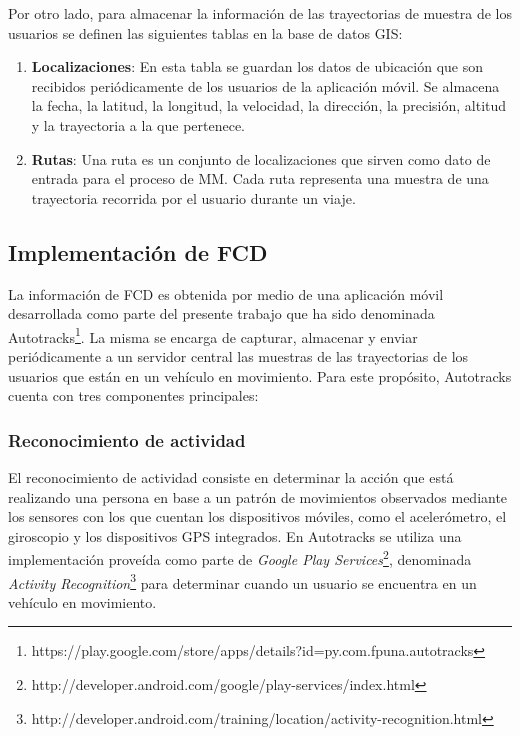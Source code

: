 Por otro lado, para almacenar la información de las trayectorias de muestra de los usuarios se definen las siguientes tablas en la base de datos GIS:
\begin{enumerate}
\item \textbf{Localizaciones}: En esta tabla se guardan los datos de ubicación que son recibidos periódicamente de los usuarios de la aplicación móvil. Se almacena la fecha, la latitud, la longitud, la velocidad, la dirección, la precisión, altitud y la trayectoria a la que pertenece.
\item \textbf{Rutas}: Una ruta es un conjunto de localizaciones que sirven como dato de entrada para el proceso de MM. Cada ruta representa una muestra de una trayectoria recorrida por el usuario durante un viaje.
\end{enumerate}

\subsection{Implementación de FCD}
\label{floating-car-data}

La información de FCD es obtenida por medio de una aplicación móvil desarrollada como parte del presente trabajo que ha sido denominada Autotracks\footnote{https://play.google.com/store/apps/details?id=py.com.fpuna.autotracks}. La misma se encarga de capturar, almacenar y enviar periódicamente a un servidor central las muestras de las trayectorias de los usuarios que están en un vehículo en movimiento. Para este propósito, Autotracks cuenta con tres componentes principales: 

\subsubsection{Reconocimiento de actividad}
\label{reconocimiento_actividad}

El reconocimiento de actividad consiste en determinar la acción que está realizando una persona en base a un patrón de movimientos observados mediante los sensores con los que cuentan los dispositivos móviles, como el acelerómetro, el giroscopio y los dispositivos GPS integrados. En Autotracks se utiliza una implementación proveída como parte de \emph{Google Play Services}\footnote{http://developer.android.com/google/play-services/index.html}, denominada \emph{Activity Recognition}\footnote{http://developer.android.com/training/location/activity-recognition.html} para determinar cuando un usuario se encuentra en un vehículo en movimiento.

